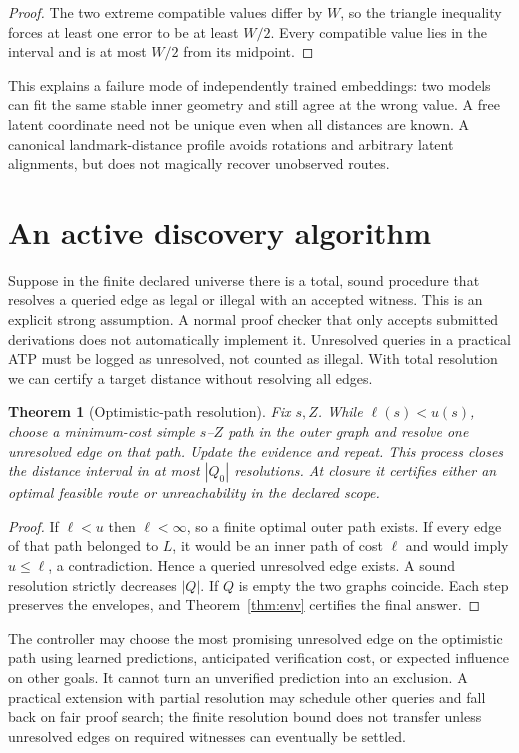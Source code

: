 \documentclass[11pt]{article}
\newtheorem{theorem}{Theorem}[section]\newtheorem{proposition}[theorem]{Proposition}\newtheorem{lemma}[theorem]{Lemma}\newtheorem{corollary}[theorem]{Corollary}
\theoremstyle{definition}\newtheorem{definition}[theorem]{Definition}\newtheorem{example}[theorem]{Example}\newtheorem{conjecture}[theorem]{Conjecture}
\begin{document}
\begin{proof} The two extreme compatible values differ by $W$, so the triangle inequality forces at least one error to be at least $W/2$. Every compatible value lies in the interval and is at most $W/2$ from its midpoint.\end{proof}
This explains a failure mode of independently trained embeddings: two models can fit the same stable inner geometry and still agree at the wrong value. A free latent coordinate need not be unique even when all distances are known. A canonical landmark-distance profile avoids rotations and arbitrary latent alignments, but does not magically recover unobserved routes.
\section{An active discovery algorithm}
Suppose in the finite declared universe there is a total, sound procedure that resolves a queried edge as legal or illegal with an accepted witness. This is an explicit strong assumption. A normal proof checker that only accepts submitted derivations does not automatically implement it. Unresolved queries in a practical ATP must be logged as unresolved, not counted as illegal. With total resolution we can certify a target distance without resolving all edges.
\begin{theorem}[Optimistic-path resolution]\label{thm:active}
Fix $s,Z$. While $\ell(s)<u(s)$, choose a minimum-cost simple $s$--$Z$ path in the outer graph and resolve one unresolved edge on that path. Update the evidence and repeat. This process closes the distance interval in at most $|Q_0|$ resolutions. At closure it certifies either an optimal feasible route or unreachability in the declared scope.
\end{theorem}
\begin{proof} If $\ell<u$ then $\ell<\infty$, so a finite optimal outer path exists. If every edge of that path belonged to $L$, it would be an inner path of cost $\ell$ and would imply $u\le\ell$, a contradiction. Hence a queried unresolved edge exists. A sound resolution strictly decreases $|Q|$. If $Q$ is empty the two graphs coincide. Each step preserves the envelopes, and Theorem~\ref{thm:env} certifies the final answer.\end{proof}
The controller may choose the most promising unresolved edge on the optimistic path using learned predictions, anticipated verification cost, or expected influence on other goals. It cannot turn an unverified prediction into an exclusion. A practical extension with partial resolution may schedule other queries and fall back on fair proof search; the finite resolution bound does not transfer unless unresolved edges on required witnesses can eventually be settled.
\end{document}
